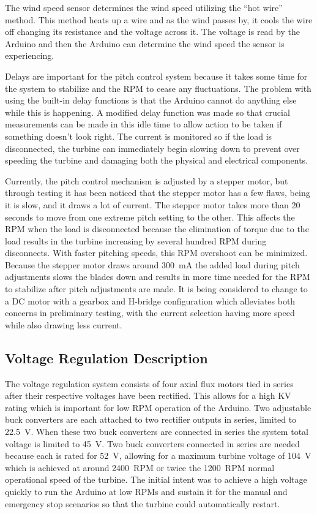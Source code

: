 \documentclass[../ewet_cwc_report.tex]{subfiles}
\begin{document}
The wind speed sensor determines the wind speed utilizing the
``hot wire'' method. This method heats up a wire and as the
wind passes by, it cools the wire off changing its resistance
and the voltage across it. The voltage is read by the Arduino
and then the Arduino can determine the wind speed the sensor is
experiencing.

Delays are important for the pitch control system because it
takes some time for the system to stabilize and the RPM to
cease any fluctuations. The problem with using the built-in
delay functions is that the Arduino cannot do anything else
while this is happening. A modified delay function was made so
that crucial measurements can be made in this idle time to
allow action to be taken if something doesn't look right. The
current is monitored so if the load is disconnected, the
turbine can immediately begin slowing down to prevent over
speeding the turbine and damaging both the physical and
electrical components.

Currently, the pitch control mechanism is adjusted by a stepper
motor, but through testing it has been noticed that the stepper
motor has a few flaws, being it is slow, and it draws a lot of
current. The stepper motor takes more than 20 seconds to move
from one extreme pitch setting to the other. This affects the
RPM when the load is disconnected because the elimination of
torque due to the load results in the turbine increasing by
several hundred RPM during disconnects. With faster pitching
speeds, this RPM overshoot can be minimized. Because the
stepper motor draws around \qty{300}{\mA} the added load during
pitch adjustments slows the blades down and results in more
time needed for the RPM to stabilize after pitch adjustments
are made. It is being considered to change to a DC motor with a
gearbox and H-bridge configuration which alleviates both
concerns in preliminary testing, with the current selection
having more speed while also drawing less current.

\subsection{Voltage Regulation Description}
The voltage regulation system consists of four axial flux
motors tied in series after their respective voltages have
been rectified. This allows for a high KV rating which is
important for low RPM operation of the Arduino. Two adjustable
buck converters are each attached to two rectifier outputs in
series, limited to \qty{22.5}{\V}. When these two buck
converters are connected in series the system total voltage is
limited to \qty{45}{\V}. Two buck converters connected in
series are needed because each is rated for \qty{52}{\V},
allowing for a maximum turbine voltage of \qty{104}{\V} which
is achieved at around \qty{2400}{RPM} or twice the
\qty{1200}{RPM} normal operational speed of the turbine. The
initial intent was to achieve a high voltage quickly to run the
Arduino at low RPMs and sustain it for the manual and
emergency stop scenarios so that the turbine could
automatically restart.
\end{document}
